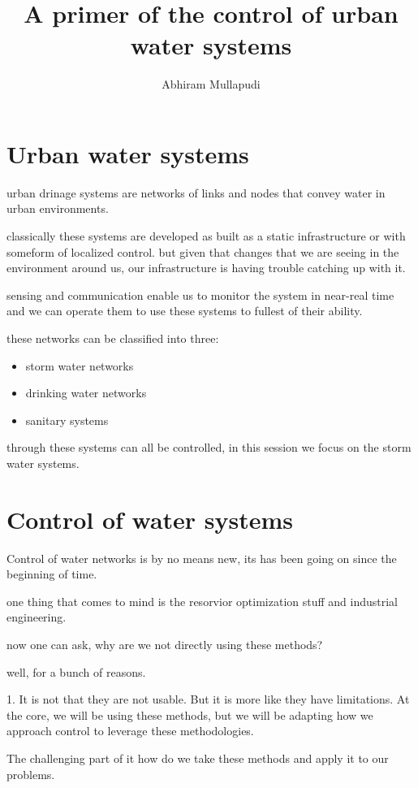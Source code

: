 \documentclass{article}
\title{A primer of the control of urban water systems}
\author{Abhiram Mullapudi}
\begin{document}
\maketitle

\section{Urban water systems}

urban drinage systems are networks of links and nodes that convey water in urban environments.

classically these systems are developed as built as a static infrastructure or with someform of localized control.
but given that changes that we are seeing in the environment around us, our infrastructure is having trouble catching up with it.

sensing and communication enable us to monitor the system in near-real time and we can operate them to use these systems to fullest of their ability. 

these networks can be classified into three:
\begin{itemize}
	\item storm water networks
	\item drinking water networks
	\item sanitary systems
\end{itemize}
through these systems can all be controlled, in this session we focus on the storm water systems.

\section{Control of water systems}
Control of water networks is by no means new, its has been going on since the beginning of time.

one thing that comes to mind is the resorvior optimization stuff and industrial engineering. 

now one can ask, why are we not directly using these methods?

well, for a bunch of reasons. 

1. It is not that they are not usable. But it is more like they have limitations.
At the core, we will be using these methods, but we will be adapting how we approach control to leverage these methodologies. 

The challenging part of it how do we take these methods and apply it to our problems.
\end{document}

